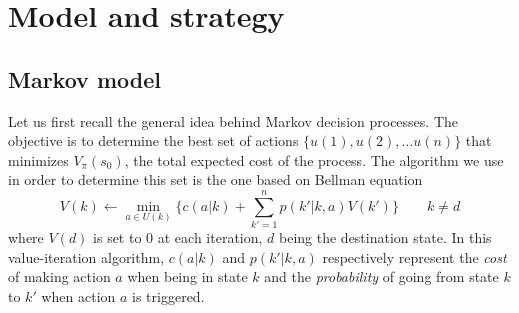 \section{Model and strategy} %
\label{sec:model_and_strategy}


% 
% 
% 
% 

\subsection{Markov model} %
\label{sub:markov_model}
Let us first recall the general idea behind Markov decision processes.
The objective is to determine the best set of actions $\{u(1), u(2), \dots
u(n)\}$ that minimizes $V_{\pi}(s_0)$, the total expected cost of the process.
The algorithm we use in order to determine this set is the one based on Bellman equation
\[
  V(k) \leftarrow \min_{a\in U(k)} \{c(a|k) 
  + \sum_{k'=1}^n p(k'|k,a)V(k') \} \qquad k \neq d
\]
where $V(d)$ is set to 0 at each iteration, $d$ being the destination state.
In this value-iteration algorithm, $c(a|k)$ and $p(k'|k,a)$
respectively represent the \emph{cost} of making action $a$
when being in state $k$ and the \emph{probability} of going
from state $k$ to $k'$ when action $a$ is triggered.

